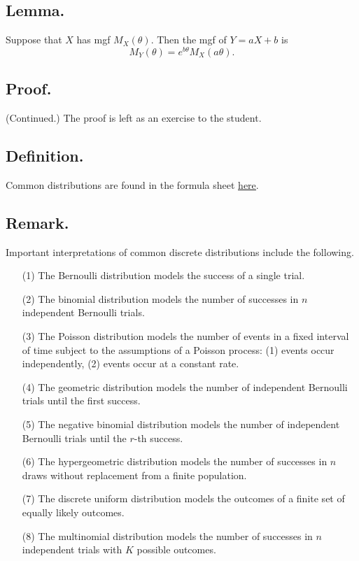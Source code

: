 \documentclass[titlepage]{article}
\begin{document}
\subsection{Lemma.} Suppose that $X$ has mgf $M_{X}(\theta)$. Then the mgf of $Y = aX + b$ is
$$M_{Y}(\theta) = e^{b\theta}M_{X}(a\theta).$$

\subsection{Proof.} (Continued.) The proof is left as an exercise to the student.

\subsection{Definition.} Common distributions are found in the formula sheet \href{https://github.com/dyao13/EN_553_420_SP24/blob/main/420distribution_table.pdf}{\underline{here}}.

\subsection{Remark.} Important interpretations of common discrete distributions include the following.
\begin{enumerate}
\item[(1)] The Bernoulli distribution models the success of a single trial.
\item[(2)] The binomial distribution models the number of successes in $n$ independent Bernoulli trials.
\item[(3)] The Poisson distribution models the number of events in a fixed interval of time subject to the assumptions of a Poisson process: (1) events occur independently, (2) events occur at a constant rate.
\item[(4)] The geometric distribution models the number of independent Bernoulli trials until the first success.
\item[(5)] The negative binomial distribution models the number of independent Bernoulli trials until the $r$-th success.
\item[(6)] The hypergeometric distribution models the number of successes in $n$ draws without replacement from a finite population.
\item[(7)] The discrete uniform distribution models the outcomes of a finite set of equally likely outcomes.
\item[(8)] The multinomial distribution models the number of successes in $n$ independent trials with $K$ possible outcomes.
\end{enumerate}
\end{document}
